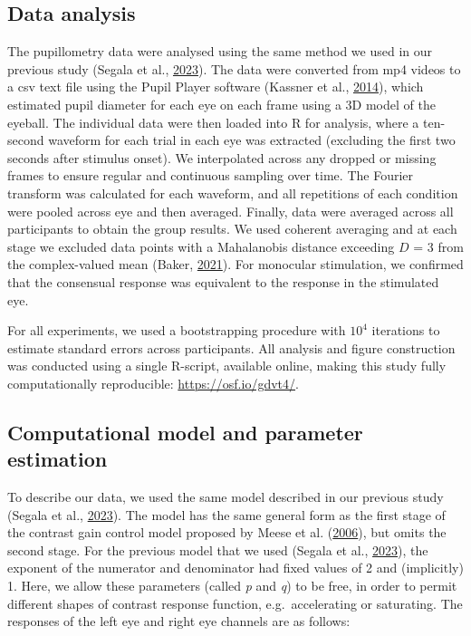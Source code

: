 \documentclass[
]{article}
\begin{document}
\hypertarget{data-analysis}{%
\subsection{Data analysis}\label{data-analysis}}

The pupillometry data were analysed using the same method we used in our previous study (Segala et al., \protect\hyperlink{ref-Segala2023}{2023}). The data were converted from mp4 videos to a csv text file using the Pupil Player software (Kassner et al., \protect\hyperlink{ref-Kassner2014}{2014}), which estimated pupil diameter for each eye on each frame using a 3D model of the eyeball. The individual data were then loaded into R for analysis, where a ten-second waveform for each trial in each eye was extracted (excluding the first two seconds after stimulus onset). We interpolated across any dropped or missing frames to ensure regular and continuous sampling over time. The Fourier transform was calculated for each waveform, and all repetitions of each condition were pooled across eye and then averaged. Finally, data were averaged across all participants to obtain the group results. We used coherent averaging and at each stage we excluded data points with a Mahalanobis distance exceeding \(D\) = 3 from the complex-valued mean (Baker, \protect\hyperlink{ref-Baker2021}{2021}). For monocular stimulation, we confirmed that the consensual response was equivalent to the response in the stimulated eye.

For all experiments, we used a bootstrapping procedure with \ensuremath{10^{4}} iterations to estimate standard errors across participants. All analysis and figure construction was conducted using a single R-script, available online, making this study fully computationally reproducible: \url{https://osf.io/gdvt4/}.

\hypertarget{computational-model-and-parameter-estimation}{%
\subsection{Computational model and parameter estimation}\label{computational-model-and-parameter-estimation}}

To describe our data, we used the same model described in our previous study (Segala et al., \protect\hyperlink{ref-Segala2023}{2023}). The model has the same general form as the first stage of the contrast gain control model proposed by Meese et al. (\protect\hyperlink{ref-Meese2006}{2006}), but omits the second stage. For the previous model that we used (Segala et al., \protect\hyperlink{ref-Segala2023}{2023}), the exponent of the numerator and denominator had fixed values of 2 and (implicitly) 1. Here, we allow these parameters (called \emph{p} and \emph{q}) to be free, in order to permit different shapes of contrast response function, e.g.~accelerating or saturating. The responses of the left eye and right eye channels are as follows:
\end{document}
